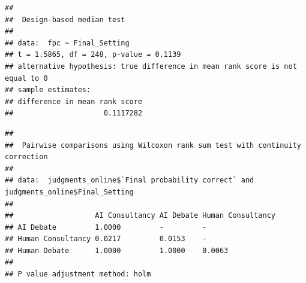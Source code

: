 \documentclass[
]{article}
\newenvironment{Shaded}{\begin{snugshade}}{\end{snugshade}}
\newcommand{\AlertTok}[1]{\textcolor[rgb]{0.94,0.16,0.16}{#1}}
\newcommand{\AttributeTok}[1]{\textcolor[rgb]{0.13,0.29,0.53}{#1}}
\newcommand{\CommentTok}[1]{\textcolor[rgb]{0.56,0.35,0.01}{\textit{#1}}}
\newcommand{\ConstantTok}[1]{\textcolor[rgb]{0.56,0.35,0.01}{#1}}
\newcommand{\FunctionTok}[1]{\textcolor[rgb]{0.13,0.29,0.53}{\textbf{#1}}}
\newcommand{\NormalTok}[1]{#1}
\newcommand{\OtherTok}[1]{\textcolor[rgb]{0.56,0.35,0.01}{#1}}
\newcommand{\SpecialCharTok}[1]{\textcolor[rgb]{0.81,0.36,0.00}{\textbf{#1}}}
\newcommand{\StringTok}[1]{\textcolor[rgb]{0.31,0.60,0.02}{#1}}
\begin{document}
\begin{verbatim}
## 
##  Design-based median test
## 
## data:  fpc ~ Final_Setting
## t = 1.5865, df = 248, p-value = 0.1139
## alternative hypothesis: true difference in mean rank score is not equal to 0
## sample estimates:
## difference in mean rank score 
##                     0.1117282
\end{verbatim}

\begin{Shaded}
\end{Shaded}

\begin{verbatim}
## 
##  Pairwise comparisons using Wilcoxon rank sum test with continuity correction 
## 
## data:  judgments_online$`Final probability correct` and judgments_online$Final_Setting 
## 
##                   AI Consultancy AI Debate Human Consultancy
## AI Debate         1.0000         -         -                
## Human Consultancy 0.0217         0.0153    -                
## Human Debate      1.0000         1.0000    0.0063           
## 
## P value adjustment method: holm
\end{verbatim}

\begin{Shaded}
\end{Shaded}
\end{document}
